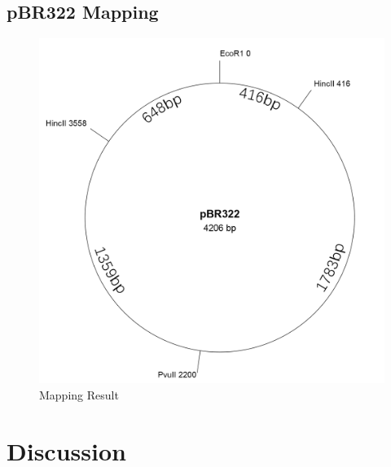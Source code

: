 \documentclass{article}
\begin{document}
        \subsection{pBR322 Mapping}
            \begin{figure}[H]
                \centering
                \includegraphics[width = 0.4\linewidth]{../Data/Plasmid/final.png}
                \caption{Mapping Result}
                \label{final.map}
            \end{figure}
    
    \section{Discussion}
\end{document}
